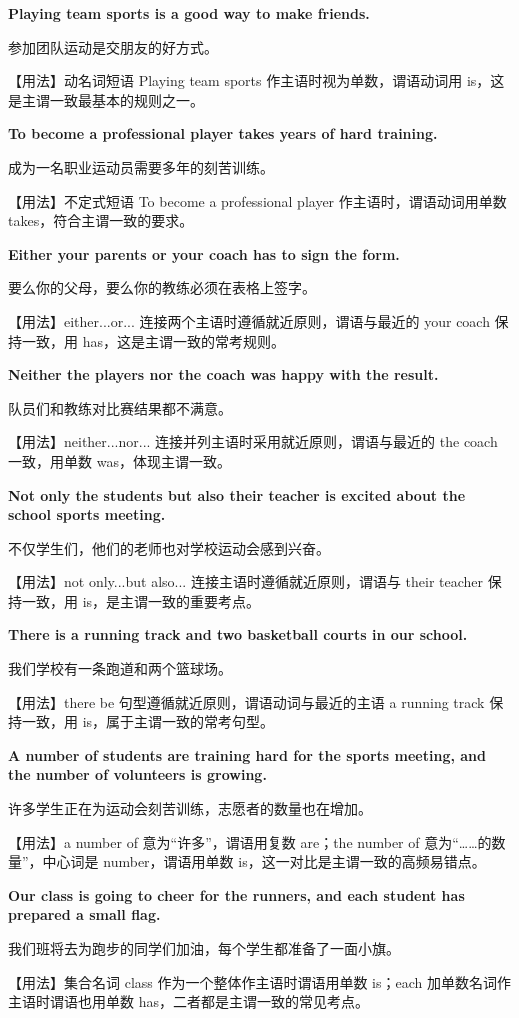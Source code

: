 \documentclass[UTF8,a4paper,11pt,oneside]{ctexbook}
\newcommand{\fansection}[1]{%
  \par\addvspace{2.4ex}%
  \Needspace{6\baselineskip}%
  \noindent{\sffamily\Large\bfseries\color{mainblue}#1}\par
  \nopagebreak
  \addvspace{0.2ex}%
  \noindent{\color{rulelight}\rule{\linewidth}{0.9pt}}\par
  \addvspace{0.9ex}%
  \nobreak
}
\newcommand{\fanpat}[3]{%
  \item{\bfseries #1}\par\nopagebreak
  {\small\color{textgray}#2}\par\nopagebreak
  {\footnotesize\color{accent!90!black}【用法】#3}\par
}
\begin{document}
\fansection{〇、本单元写作常用句型}
\begin{fanpatterns}

\fanpat{Playing team sports is a good way to make friends.}{参加团队运动是交朋友的好方式。}{动名词短语 Playing team sports 作主语时视为单数，谓语动词用 is，这是主谓一致最基本的规则之一。}

\fanpat{To become a professional player takes years of hard training.}{成为一名职业运动员需要多年的刻苦训练。}{不定式短语 To become a professional player 作主语时，谓语动词用单数 takes，符合主谓一致的要求。}

\fanpat{Either your parents or your coach has to sign the form.}{要么你的父母，要么你的教练必须在表格上签字。}{either...or... 连接两个主语时遵循就近原则，谓语与最近的 your coach 保持一致，用 has，这是主谓一致的常考规则。}

\fanpat{Neither the players nor the coach was happy with the result.}{队员们和教练对比赛结果都不满意。}{neither...nor... 连接并列主语时采用就近原则，谓语与最近的 the coach 一致，用单数 was，体现主谓一致。}

\fanpat{Not only the students but also their teacher is excited about the school sports meeting.}{不仅学生们，他们的老师也对学校运动会感到兴奋。}{not only...but also... 连接主语时遵循就近原则，谓语与 their teacher 保持一致，用 is，是主谓一致的重要考点。}

\fanpat{There is a running track and two basketball courts in our school.}{我们学校有一条跑道和两个篮球场。}{there be 句型遵循就近原则，谓语动词与最近的主语 a running track 保持一致，用 is，属于主谓一致的常考句型。}

\fanpat{A number of students are training hard for the sports meeting, and the number of volunteers is growing.}{许多学生正在为运动会刻苦训练，志愿者的数量也在增加。}{a number of 意为“许多”，谓语用复数 are；the number of 意为“……的数量”，中心词是 number，谓语用单数 is，这一对比是主谓一致的高频易错点。}

\fanpat{Our class is going to cheer for the runners, and each student has prepared a small flag.}{我们班将去为跑步的同学们加油，每个学生都准备了一面小旗。}{集合名词 class 作为一个整体作主语时谓语用单数 is；each 加单数名词作主语时谓语也用单数 has，二者都是主谓一致的常见考点。}

\end{fanpatterns}

\fansection{一、满分范文}
\end{document}
